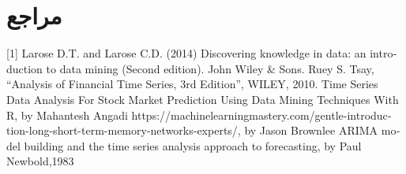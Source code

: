 \documentclass[12pt]{report}
\begin{document}
\chapter*{مراجع}
\begin{latin}
[1] Larose D.T. and Larose C.D. (2014) Discovering knowledge in data: an introduction to data mining (Second edition). John Wiley \& Sons.
\newline
\newline
[2] Ruey S. Tsay, “Analysis of Financial Time Series, 3rd Edition”, WILEY, 2010.
\newline
\newline
[3] Time Series Data Analysis For Stock Market Prediction Using Data Mining Techniques With R, by Mahantesh Angadi
\newline
\newline
[4] https://machinelearningmastery.com/gentle-introduction-long-short-term-memory-networks-experts/, by Jason Brownlee
\newline
\newline
[5] ARIMA model building and the time series analysis approach to forecasting, by Paul Newbold,1983
\end{latin}
\end{document}
